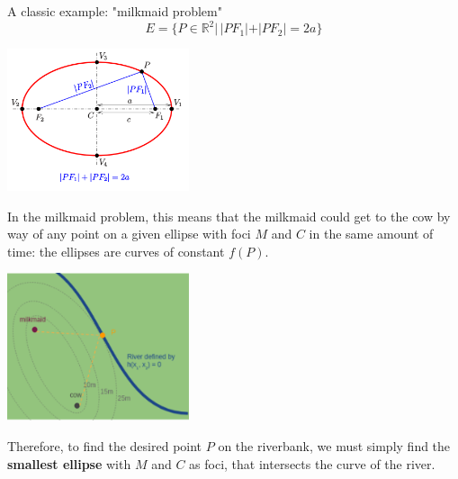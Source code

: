 \begin{vbframe}{A classic example: "milkmaid problem"}
$$
E = \{ P \in \mathbb{R}^2 | \, |PF_1| + |PF_2| = 2a \}
$$

\vspace*{0.2cm} 

\begin{center}
	\includegraphics[width = 0.4\textwidth]{figure_man/ellipse.png}
\end{center}

\framebreak 




In the milkmaid problem, this means that the milkmaid could get to the cow by way of any point on a given ellipse with foci $M$ and $C$ in the same amount of time: the ellipses are curves of constant $f(P)$. 

\vspace*{0.2cm} 

\begin{center}
	\includegraphics[width = 0.4\textwidth]{figure_man/milkmaid4.png}
\end{center}


\framebreak

Therefore, to find the desired point $P$ on the riverbank, we must simply find the \textbf{smallest ellipse} with $M$ and $C$ as foci, that intersects the curve of the river. 

\vspace*{0.2cm} 


\end{vbframe}
